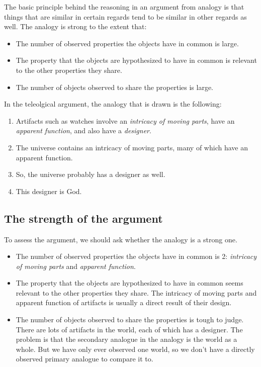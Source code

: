 \documentclass[letterpaper,10pt]{article}
\begin{document}
The basic principle behind the reasoning in an argument from analogy is that things that are similar in certain regards tend to be similar in other regards as well.  The analogy is strong to the extent that:
\begin{itemize}
 \item The number of observed properties the objects have in common is large.
 \item The property that the objects are hypothesized to have in common is relevant to the other properties they share.
 \item The number of objects observed to share the properties is large.
\end{itemize}

In the teleolgical argument, the analogy that is drawn is the following:
\begin{enumerate}
 \item Artifacts such as watches involve an \textit{intricacy of moving parts}, have an \textit{apparent function}, and also have a \textit{designer}.
 \item The universe contains an intricacy of moving parts, many of which have an apparent function.
 \item So, the universe probably has a designer as well.
 \item This designer is God.
\end{enumerate}

\subsection{The strength of the argument}

To assess the argument, we should ask whether the analogy is a strong one. 
\begin{itemize}
 \item The number of observed properties the objects have in common is 2: \textit{intricacy of moving parts} and \textit{apparent function}.
 \item The property that the objects are hypothesized to have in common seems relevant to the other properties they share. The intricacy of moving parts and apparent function of artifacts is usually a direct result of their design.
 \item The number of objects observed to share the properties is tough to judge.  There are lots of artifacts in the world, each of which has a designer.   The problem is that the secondary analogue in the analogy is the world as a whole. But we have only ever observed one world, so we don't have a directly observed primary analogue to compare it to.
\end{itemize}
\end{document}
